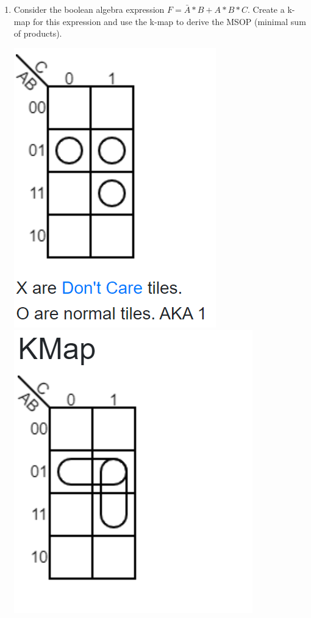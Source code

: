 \documentclass[10pt]{article}
\begin{document}
\begin{itemize}
\begin{enumerate}
\item Consider the boolean algebra expression $F = \bar{A} *B + A*B*C$.  Create a k-map for this expression and use the k-map to derive the MSOP (minimal sum of products).

\includegraphics[scale=.8]{Problem5kmap.png}
\includegraphics[scale=.8]{Problem5minimized.png}

\end{enumerate}
\end{itemize}
\end{document}
